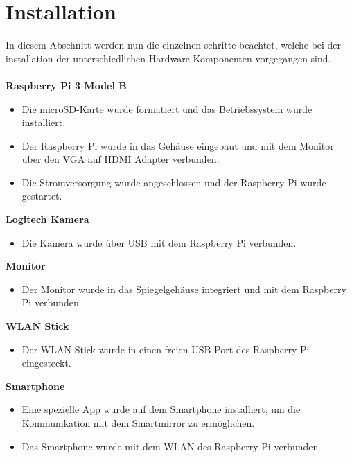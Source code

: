 \section{Installation}
In diesem Abschnitt werden nun die einzelnen schritte beachtet, welche bei der installation der unterschiedlichen Hardware Komponenten vorgegangen sind. \\ \\
\noindent
\textbf{Raspberry Pi 3 Model B}
\begin{itemize}
    \item Die microSD-Karte wurde formatiert und das Betriebssystem wurde installiert.
    \item Der Raspberry Pi wurde in das Gehäuse eingebaut und mit dem Monitor über den VGA auf HDMI Adapter verbunden.
    \item Die Stromversorgung wurde angeschlossen und der Raspberry Pi wurde gestartet.
\end{itemize}
\vspace{0.5cm}
\noindent\textbf{Logitech Kamera}
\begin{itemize}
    \item Die Kamera wurde über USB mit dem Raspberry Pi verbunden.
\end{itemize}
\vspace{0.5cm}
\noindent\textbf{Monitor} 
\begin{itemize}
    \item Der Monitor wurde in das Spiegelgehäuse integriert und mit dem Raspberry Pi verbunden.
\end{itemize}
\vspace{0.5cm}
\noindent\textbf{WLAN Stick}
\begin{itemize}
    \item Der WLAN Stick wurde in einen freien USB Port des Raspberry Pi eingesteckt.
\end{itemize}
\vspace{0.5cm}
\noindent\textbf{Smartphone}
\begin{itemize}
    \item Eine spezielle App wurde auf dem Smartphone installiert, um die Kommunikation mit dem Smartmirror zu ermöglichen.
    \item Das Smartphone wurde mit dem WLAN des Raspberry Pi verbunden
\end{itemize}

